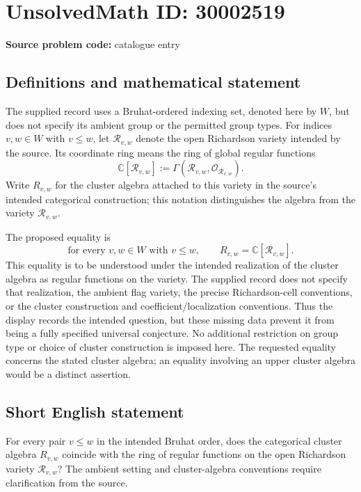 \documentclass[11pt]{article}
\newcommand{\C}{\mathbb{C}}
\begin{document}
\section*{UnsolvedMath ID: 30002519}
\textbf{Source problem code:} catalogue entry
\subsection{Definitions and mathematical statement}
The supplied record uses a Bruhat-ordered indexing set, denoted here by \(W\), but does not specify its ambient group or the permitted group types. For indices \(v,w\in W\) with \(v\leq w\), let \(\mathcal R_{v,w}\) denote the open Richardson variety intended by the source. Its coordinate ring means the ring of global regular functions
\[
\C[\mathcal R_{v,w}]:=\Gamma(\mathcal R_{v,w},\mathcal O_{\mathcal R_{v,w}}).
\]
Write \(R_{v,w}\) for the cluster algebra attached to this variety in the source's intended categorical construction; this notation distinguishes the algebra from the variety \(\mathcal R_{v,w}\).

The proposed equality is
\[
\text{for every }v,w\in W\text{ with }v\leq w,\qquad
R_{v,w}=\C[\mathcal R_{v,w}].
\]
This equality is to be understood under the intended realization of the cluster algebra as regular functions on the variety. The supplied record does not specify that realization, the ambient flag variety, the precise Richardson-cell conventions, or the cluster construction and coefficient/localization conventions. Thus the display records the intended question, but these missing data prevent it from being a fully specified universal conjecture. No additional restriction on group type or choice of cluster construction is imposed here. The requested equality concerns the stated cluster algebra; an equality involving an upper cluster algebra would be a distinct assertion.
\subsection{Short English statement}
For every pair \(v\leq w\) in the intended Bruhat order, does the categorical cluster algebra \(R_{v,w}\) coincide with the ring of regular functions on the open Richardson variety \(\mathcal R_{v,w}\)? The ambient setting and cluster-algebra conventions require clarification from the source.
\end{document}
